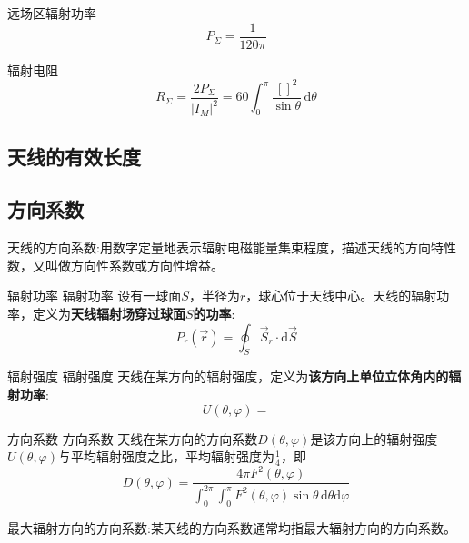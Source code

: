         远场区辐射功率
        \begin{equation}
            P_\Sigma=\frac{1}{120\pi}
        \end{equation}

        辐射电阻
        \begin{equation}
            R_\Sigma=\frac{2P_\Sigma}{|I_M|^2}=60 \int_{0}^{\pi}\frac{[]^2}{\sin\theta}\,\mathrm{d}\theta
        \end{equation}

    \subsection{天线的有效长度}
    \subsection{方向系数}
        天线的方向系数:用数字定量地表示辐射电磁能量集束程度，描述天线的方向特性数，又叫做方向性系数或方向性增益。
        
        
        \begin{definition}
        {辐射功率}
        {辐射功率}
            设有一球面$S$，半径为$r$，球心位于天线中心。天线的辐射功率，定义为\textbf{天线辐射场穿过球面$S$的功率}:
            \begin{equation}
                P_r(\vec{r})
                =\oint_S \vec{S}_r\cdot\mathrm{d}\vec{S}
            \end{equation}
        \end{definition}

        \begin{definition}
        {辐射强度}
        {辐射强度}
            天线在某方向的辐射强度，定义为\textbf{该方向上单位立体角内的辐射功率}:
            \begin{equation}
                U(\theta,\varphi)=
            \end{equation}
        \end{definition}

        \begin{definition}
        {方向系数}
        {方向系数}
            天线在某方向的方向系数$D(\theta,\varphi)$是该方向上的辐射强度$U(\theta,\varphi)$与平均辐射强度之比，平均辐射强度为$\frac{1}{4}$，即
            \begin{equation}
                D(\theta,\varphi)=\frac{4\pi F^2(\theta,\varphi)}{\int_{0}^{2\pi}\int_{0}^{\pi}F^2(\theta,\varphi)\sin\theta\,\mathrm{d}\theta\mathrm{d}\varphi}
            \end{equation}

            最大辐射方向的方向系数:某天线的方向系数通常均指最大辐射方向的方向系数。

        \end{definition}

